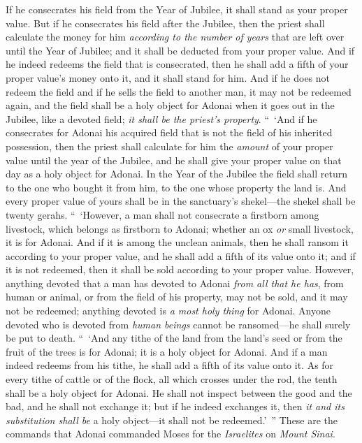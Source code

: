 \begin{biblechapter}
\verse If he consecrates his field from the Year of Jubilee, it shall stand as your proper value.
\verse But if he consecrates his field after the Jubilee, then the priest shall calculate the money for him \textit{according to the number of years} that are left over until the Year of Jubilee; and it shall be deducted from your proper value.
\verse And if he indeed redeems the field that is consecrated, then he shall add a fifth of your proper value’s money onto it, and it shall stand for him.
\verse And if he does not redeem the field and if he sells the field to another man, it may not be redeemed again,
\verse and the field shall be a holy object for Adonai when it goes out in the Jubilee, like a devoted field; \textit{it shall be the priest’s property}.
\verse “ ‘And if he consecrates for Adonai his acquired field that is not the field of his inherited possession,
\verse then the priest shall calculate for him the \textit{amount} of your proper value until the year of the Jubilee, and he shall give your proper value on that day as a holy object for Adonai.
\verse In the Year of the Jubilee the field shall return to the one who bought it from him, to the one whose property the land is.
\verse And every proper value of yours shall be in the sanctuary’s shekel—the shekel shall be twenty gerahs.
\verse “ ‘However, a man shall not consecrate a firstborn among livestock, which belongs as firstborn to Adonai; whether an ox \textit{or} small livestock, it is for Adonai.
\verse And if it is among the unclean animals, then he shall ransom it according to your proper value, and he shall add a fifth of its value onto it; and if it is not redeemed, then it shall be sold according to your proper value.
\verse However, anything devoted that a man has devoted to Adonai \textit{from all that he has}, from human or animal, or from the field of his property, may not be sold, and it may not be redeemed; anything devoted is \textit{a most holy thing} for Adonai.
\verse Anyone devoted who is devoted from \textit{human beings} cannot be ransomed—he shall surely be put to death.
\verse “ ‘And any tithe of the land from the land’s seed or from the fruit of the trees is for Adonai; it is a holy object for Adonai.
\verse And if a man indeed redeems from his tithe, he shall add a fifth of its value onto it.
\verse As for every tithe of cattle or of the flock, all which crosses under the rod, the tenth shall be a holy object for Adonai.
\verse He shall not inspect between the good and the bad, and he shall not exchange it; but if he indeed exchanges it, then \textit{it and its substitution shall be} a holy object—it shall not be redeemed.’ ”
\verse These are the commands that Adonai commanded Moses for the \textit{Israelites} on \textit{Mount Sinai}.
\end{biblechapter}

